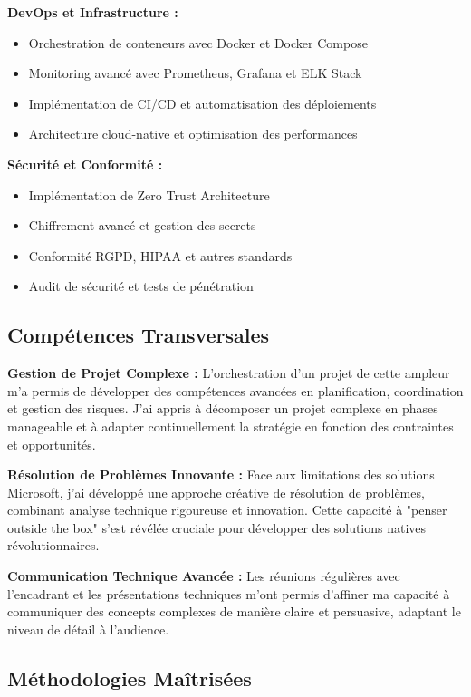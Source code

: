 \documentclass[a4paper,12pt]{article}
\begin{document}
\textbf{DevOps et Infrastructure :}
\begin{itemize}
    \item Orchestration de conteneurs avec Docker et Docker Compose
    \item Monitoring avancé avec Prometheus, Grafana et ELK Stack
    \item Implémentation de CI/CD et automatisation des déploiements
    \item Architecture cloud-native et optimisation des performances
\end{itemize}

\textbf{Sécurité et Conformité :}
\begin{itemize}
    \item Implémentation de Zero Trust Architecture
    \item Chiffrement avancé et gestion des secrets
    \item Conformité RGPD, HIPAA et autres standards
    \item Audit de sécurité et tests de pénétration
\end{itemize}

\subsection{Compétences Transversales}

\textbf{Gestion de Projet Complexe :}
L'orchestration d'un projet de cette ampleur m'a permis de développer des compétences avancées en planification, coordination et gestion des risques. J'ai appris à décomposer un projet complexe en phases manageable et à adapter continuellement la stratégie en fonction des contraintes et opportunités.

\textbf{Résolution de Problèmes Innovante :}
Face aux limitations des solutions Microsoft, j'ai développé une approche créative de résolution de problèmes, combinant analyse technique rigoureuse et innovation. Cette capacité à "penser outside the box" s'est révélée cruciale pour développer des solutions natives révolutionnaires.

\textbf{Communication Technique Avancée :}
Les réunions régulières avec l'encadrant et les présentations techniques m'ont permis d'affiner ma capacité à communiquer des concepts complexes de manière claire et persuasive, adaptant le niveau de détail à l'audience.

\subsection{Méthodologies Maîtrisées}
\end{document}
